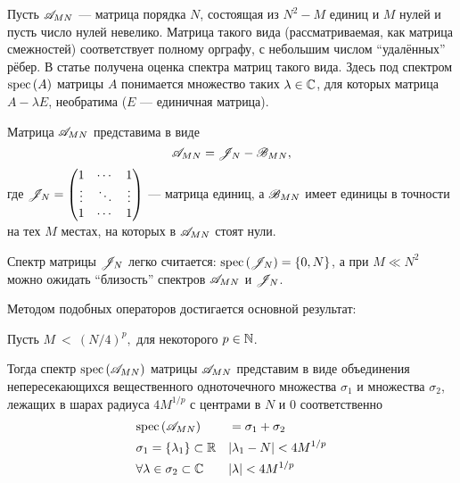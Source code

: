 Пусть \( \mathscr{A}_{{M}{N}} \) --- матрица порядка \( N \),
состоящая из \( N^2 - M \) единиц и \( M \) нулей
и пусть число нулей невелико.
Матрица такого вида (рассматриваемая, как матрица смежностей) соответствует
полному орграфу, с небольшим числом ``удалённых'' рёбер.
В статье получена оценка спектра
матриц такого вида.
Здесь под спектром \( \mathrm{spec}\left({A}\right) \) матрицы \( A \)
понимается множество таких \( \lambda\in\mathbb{C} \), для которых
матрица \( A - \lambda E \), необратима (\( E \) --- единичная матрица).

Матрица \( \mathscr{A}_{{M}{N}} \) представима в виде
\[
    \mathscr{A}_{{M}{N}} = \mathscr{J}_{N} - \mathscr{B}_{{M}{N}},
    \]
где \(
\mathscr{J}_{N} =
\begin{pmatrix}1 & \cdots & 1 \\
\vdots & \ddots & \vdots \\
1 & \cdots & 1
\end{pmatrix} \) --- матрица единиц,
а \( \mathscr{B}_{{M}{N}} \) имеет единицы в точности на тех \( M \)
местах, на которых в \( \mathscr{A}_{{M}{N}} \) стоят нули.

Спектр матрицы \( \mathscr{J}_{N} \) легко считается:
\( \mathrm{spec}\left({\mathscr{J}_{N}}\right) = \left\{0, N \right\} \),
а при \( M \ll N^2 \) можно ожидать ``близость'' спектров
\( \mathscr{A}_{{M}{N}} \) и \( \mathscr{J}_{N} \).

Методом подобных операторов \cite{baskakov-harmonic}
достигается основной результат:
\begin{thm}\label{thm:almostallones-spectra}
    Пусть
    \(M~<~\displaystyle{\left(N/4\right)^p}, \)
    для некоторого \( p\in\mathbb{N} \).

    Тогда спектр \( \mathrm{spec}\left({\mathscr{A}_{{M}{N}}}\right) \)
    матрицы \( \mathscr{A}_{{M}{N}} \)
    представим в виде объединения непересекающихся
    вещественного одноточечного множества \( \sigma_1 \)
    и множества \( \sigma_2 \),
    лежащих в шарах радиуса \( 4M^{1/p} \)
    с центрами в \( N \) и \( 0 \) соответственно
    \begin{equation}\begin{aligned}
        & \mathrm{spec}\left({ \mathscr{A}_{{M}{N}} }\right) &&=
        \sigma_1 + \sigma_2 \\
        & \sigma_1 = \left\{\lambda_1\right\} \subset\mathbb{R}
                   && \lvert\lambda_1 - N\rvert < 4M^{1/p} \\
        & \forall \lambda\in\sigma_2 \subset\mathbb{C}
                   && \lvert\lambda\rvert < 4M^{1/p}
    \end{aligned}\end{equation}
\end{thm}

